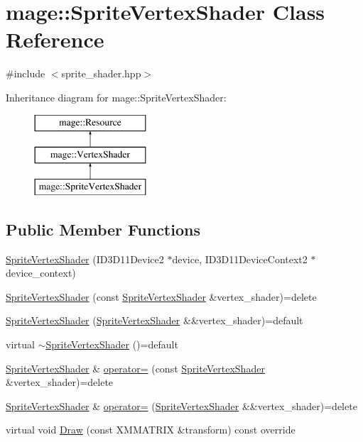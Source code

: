 \hypertarget{classmage_1_1_sprite_vertex_shader}{}\section{mage\+:\+:Sprite\+Vertex\+Shader Class Reference}
\label{classmage_1_1_sprite_vertex_shader}


{\ttfamily \#include $<$sprite\+\_\+shader.\+hpp$>$}

Inheritance diagram for mage\+:\+:Sprite\+Vertex\+Shader\+:\begin{figure}[H]
\begin{center}
\leavevmode
\includegraphics[height=3.000000cm]{classmage_1_1_sprite_vertex_shader}
\end{center}
\end{figure}
\subsection*{Public Member Functions}
\begin{DoxyCompactItemize}
\item 
\hyperlink{classmage_1_1_sprite_vertex_shader_a57f08ac16ace6190281fb4fa413c1b9e}{Sprite\+Vertex\+Shader} (I\+D3\+D11\+Device2 $\ast$device, I\+D3\+D11\+Device\+Context2 $\ast$device\+\_\+context)
\item 
\hyperlink{classmage_1_1_sprite_vertex_shader_a00f902a89cc3f9c9ce3d5b526eece29c}{Sprite\+Vertex\+Shader} (const \hyperlink{classmage_1_1_sprite_vertex_shader}{Sprite\+Vertex\+Shader} \&vertex\+\_\+shader)=delete
\item 
\hyperlink{classmage_1_1_sprite_vertex_shader_afb8c1866f6ffdb0fdcd1017591b8c832}{Sprite\+Vertex\+Shader} (\hyperlink{classmage_1_1_sprite_vertex_shader}{Sprite\+Vertex\+Shader} \&\&vertex\+\_\+shader)=default
\item 
virtual \hyperlink{classmage_1_1_sprite_vertex_shader_a8bed9663e8aac773ed31c58ca6e0d98f}{$\sim$\+Sprite\+Vertex\+Shader} ()=default
\item 
\hyperlink{classmage_1_1_sprite_vertex_shader}{Sprite\+Vertex\+Shader} \& \hyperlink{classmage_1_1_sprite_vertex_shader_a4400ddda9637b280b7c8aedeeec6e4e7}{operator=} (const \hyperlink{classmage_1_1_sprite_vertex_shader}{Sprite\+Vertex\+Shader} \&vertex\+\_\+shader)=delete
\item 
\hyperlink{classmage_1_1_sprite_vertex_shader}{Sprite\+Vertex\+Shader} \& \hyperlink{classmage_1_1_sprite_vertex_shader_aac64cf5df2b118ba95be72aef2bd3dca}{operator=} (\hyperlink{classmage_1_1_sprite_vertex_shader}{Sprite\+Vertex\+Shader} \&\&vertex\+\_\+shader)=delete
\item 
virtual void \hyperlink{classmage_1_1_sprite_vertex_shader_afbdc0824aca486a3f5d3750b9363d143}{Draw} (const X\+M\+M\+A\+T\+R\+IX \&transform) const override
\end{DoxyCompactItemize}
